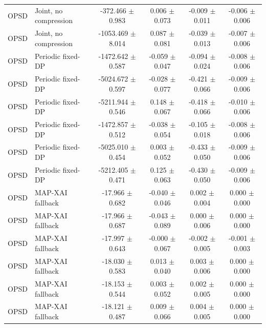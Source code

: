 \begin{tabular}{llcccc}
OPSD & Joint, no compression & -372.466 $\pm$ 0.983 & 0.006 $\pm$ 0.073 & -0.009 $\pm$ 0.011 & -0.006 $\pm$ 0.006 \\
OPSD & Joint, no compression & -1053.469 $\pm$ 8.014 & 0.087 $\pm$ 0.081 & -0.039 $\pm$ 0.013 & -0.007 $\pm$ 0.006 \\
OPSD & Periodic fixed-DP & -1472.642 $\pm$ 0.587 & -0.059 $\pm$ 0.047 & -0.094 $\pm$ 0.024 & -0.008 $\pm$ 0.006 \\
OPSD & Periodic fixed-DP & -5024.672 $\pm$ 0.597 & -0.028 $\pm$ 0.077 & -0.421 $\pm$ 0.066 & -0.009 $\pm$ 0.006 \\
OPSD & Periodic fixed-DP & -5211.944 $\pm$ 0.546 & 0.148 $\pm$ 0.067 & -0.418 $\pm$ 0.066 & -0.010 $\pm$ 0.006 \\
OPSD & Periodic fixed-DP & -1472.857 $\pm$ 0.512 & -0.038 $\pm$ 0.054 & -0.105 $\pm$ 0.018 & -0.008 $\pm$ 0.006 \\
OPSD & Periodic fixed-DP & -5025.010 $\pm$ 0.454 & 0.003 $\pm$ 0.052 & -0.433 $\pm$ 0.050 & -0.009 $\pm$ 0.006 \\
OPSD & Periodic fixed-DP & -5212.405 $\pm$ 0.471 & 0.125 $\pm$ 0.063 & -0.430 $\pm$ 0.050 & -0.009 $\pm$ 0.006 \\
OPSD & MAP-XAI fallback & -17.966 $\pm$ 0.682 & -0.040 $\pm$ 0.046 & 0.002 $\pm$ 0.004 & 0.000 $\pm$ 0.000 \\
OPSD & MAP-XAI fallback & -17.966 $\pm$ 0.687 & -0.043 $\pm$ 0.089 & 0.000 $\pm$ 0.006 & 0.000 $\pm$ 0.000 \\
OPSD & MAP-XAI fallback & -17.997 $\pm$ 0.643 & -0.000 $\pm$ 0.067 & -0.002 $\pm$ 0.005 & -0.001 $\pm$ 0.003 \\
OPSD & MAP-XAI fallback & -18.030 $\pm$ 0.583 & 0.013 $\pm$ 0.040 & 0.003 $\pm$ 0.006 & 0.000 $\pm$ 0.000 \\
OPSD & MAP-XAI fallback & -18.153 $\pm$ 0.544 & 0.003 $\pm$ 0.052 & 0.002 $\pm$ 0.005 & 0.000 $\pm$ 0.000 \\
OPSD & MAP-XAI fallback & -18.121 $\pm$ 0.487 & 0.009 $\pm$ 0.066 & 0.004 $\pm$ 0.005 & 0.000 $\pm$ 0.000 \\
\bottomrule
\end{tabular}
